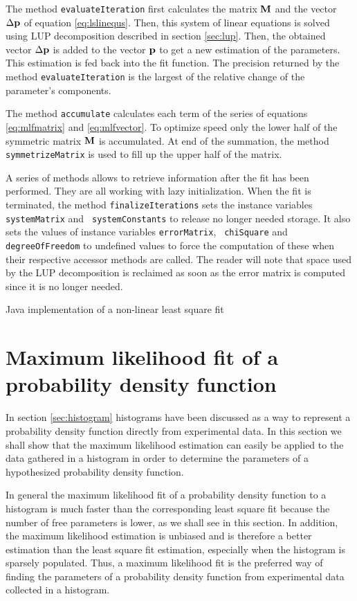 \documentclass[twoside]{book}
\begin{document}
The method {\tt evaluateIteration} first calculates the matrix
${\bf M}$ and the vector $\Delta{\bf p}$ of equation
\ref{eq:lslinequs}. Then, this system of linear equations is
solved using LUP decomposition described in section \ref{sec:lup}.
Then, the obtained vector $\Delta{\bf p}$ is added to the vector
${\bf p}$ to get a new estimation of the parameters. This
estimation is fed back into the fit function. The precision
returned by the method {\tt evaluateIteration} is the largest of
the relative change of the parameter's components.

The method {\tt accumulate} calculates each term of the series of
equations \ref{eq:mlfmatrix} and \ref{eq:mlfvector}. To optimize
speed only the lower half of the symmetric matrix ${\bf M}$ is
accumulated. At end of the summation, the method {\tt
symmetrizeMatrix} is used to fill up the upper half of the matrix.

A series of methods allows to retrieve information after the fit
has been performed. They are all working with lazy initialization.
When the fit is terminated, the method {\tt finalizeIterations}
sets the instance variables {\tt systemMatrix} and {\tt
systemConstants} to release no longer needed storage. It also sets
the values of instance variables {\tt errorMatrix}, {\tt
chiSquare} and {\tt degreeOfFreedom} to undefined values to force
the computation of these when their respective accessor methods
are called. The reader will note that space used by the LUP
decomposition is reclaimed as soon as the error matrix is computed
since it is no longer needed.

\begin{listing} Java implementation of a non-linear
least square fit \label{lj:lsfnonlin}

\end{listing}


\section{Maximum likelihood fit of a probability density function}
\label{sec:mlfhist} In section \ref{sec:histogram} histograms have
been discussed as a way to represent a probability density
function directly from experimental data. In this section we shall
show that the maximum likelihood estimation can easily be applied
to the data gathered in a histogram in order to determine the
parameters of a hypothesized probability density function.

In general the maximum likelihood fit of a probability density
function to a histogram is much faster than the corresponding
least square fit because the number of free parameters is lower,
as we shall see in this section. In addition, the maximum
likelihood estimation is unbiased and is therefore a better
estimation than the least square fit estimation, especially when
the histogram is sparsely populated. Thus, a maximum likelihood
fit is the preferred way of finding the parameters of a
probability density function from experimental data collected in a
histogram.
\end{document}
